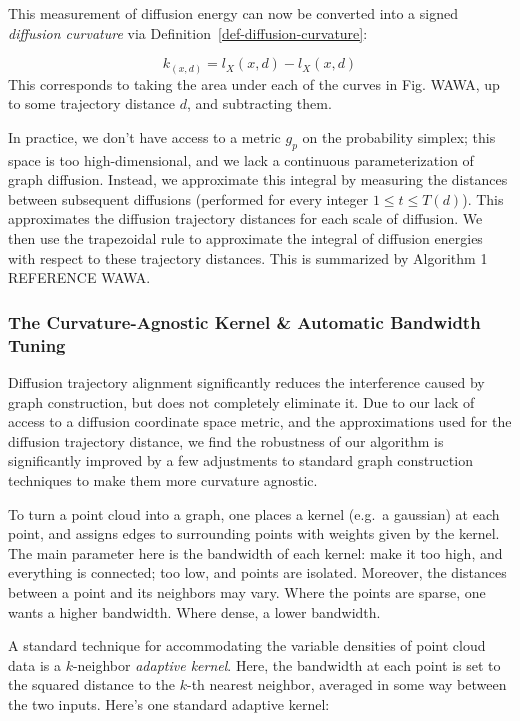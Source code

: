 \documentclass[
  letterpaper,
  DIV=11,
  numbers=noendperiod]{scrartcl}
\theoremstyle{plain}
\theoremstyle{definition}
\theoremstyle{plain}
\theoremstyle{definition}
\theoremstyle{plain}
\theoremstyle{remark}
\begin{document}
This measurement of diffusion energy can now be converted into a signed
\emph{diffusion curvature} via Definition~\ref{def-diffusion-curvature}:

\[
k_(x, d) = l_{X}(x, d) - l_{X}(x, d)
\] This corresponds to taking the area under each of the curves in Fig.
WAWA, up to some trajectory distance \(d\), and subtracting them.

In practice, we don't have access to a metric \(g_{p}\) on the
probability simplex; this space is too high-dimensional, and we lack a
continuous parameterization of graph diffusion. Instead, we approximate
this integral by measuring the distances between subsequent diffusions
(performed for every integer \(1 \leq t \leq T(d)\)). This approximates
the diffusion trajectory distances for each scale of diffusion. We then
use the trapezoidal rule to approximate the integral of diffusion
energies with respect to these trajectory distances. This is summarized
by Algorithm 1 REFERENCE WAWA.

\subsubsection{The Curvature-Agnostic Kernel \& Automatic Bandwidth
Tuning}\label{the-curvature-agnostic-kernel-automatic-bandwidth-tuning}

Diffusion trajectory alignment significantly reduces the interference
caused by graph construction, but does not completely eliminate it. Due
to our lack of access to a diffusion coordinate space metric, and the
approximations used for the diffusion trajectory distance, we find the
robustness of our algorithm is significantly improved by a few
adjustments to standard graph construction techniques to make them more
curvature agnostic.

To turn a point cloud into a graph, one places a kernel (e.g.~a
gaussian) at each point, and assigns edges to surrounding points with
weights given by the kernel. The main parameter here is the bandwidth of
each kernel: make it too high, and everything is connected; too low, and
points are isolated. Moreover, the distances between a point and its
neighbors may vary. Where the points are sparse, one wants a higher
bandwidth. Where dense, a lower bandwidth.

A standard technique for accommodating the variable densities of point
cloud data is a \(k\)-neighbor \emph{adaptive kernel}. Here, the
bandwidth at each point is set to the squared distance to the \(k\)-th
nearest neighbor, averaged in some way between the two inputs. Here's
one standard adaptive kernel:
\end{document}
